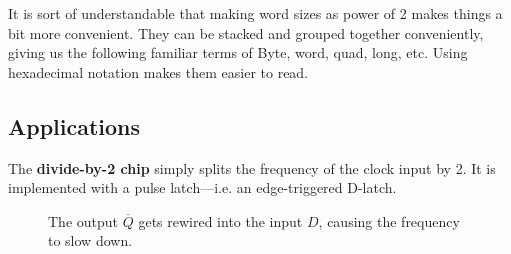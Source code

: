   It is sort of understandable that making word sizes as power of 2 makes things a bit more convenient. They can be stacked and grouped together conveniently, giving us the following familiar terms of Byte, word, quad, long, etc. Using hexadecimal notation makes them easier to read. 

\subsection{Applications}
  
  \begin{definition}
    The \textbf{divide-by-2 chip} simply splits the frequency of the clock input by 2. It is implemented with a pulse latch---i.e. an edge-triggered D-latch. 

    \begin{figure}[H]
      \centering 
      \caption{The output $\overline{Q}$ gets rewired into the input $D$, causing the frequency to slow down.}
    \end{figure}
  \end{definition}

